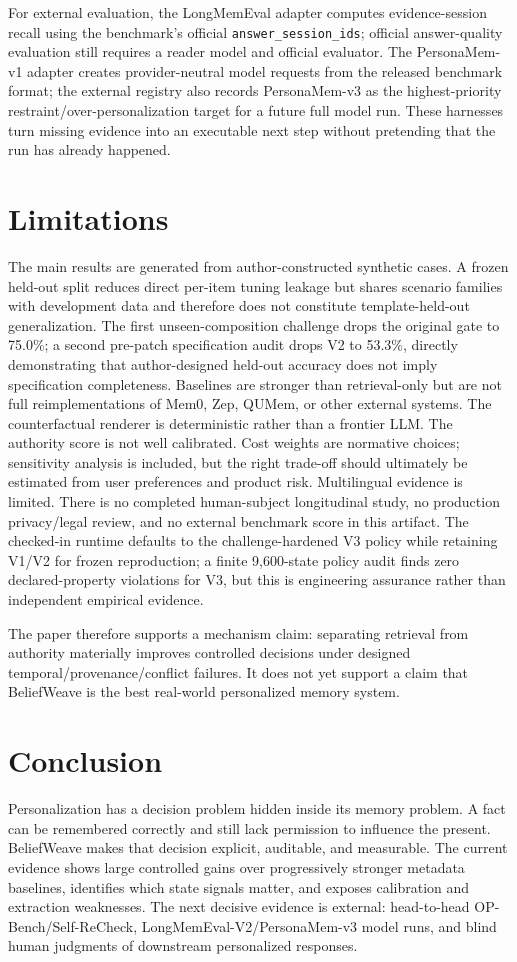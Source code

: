 \documentclass[10pt]{article}
\begin{document}
For external evaluation, the LongMemEval adapter computes evidence-session recall using the benchmark's official \texttt{answer\_session\_ids}; official answer-quality evaluation still requires a reader model and official evaluator. The PersonaMem-v1 adapter creates provider-neutral model requests from the released benchmark format; the external registry also records PersonaMem-v3 as the highest-priority restraint/over-personalization target for a future full model run. These harnesses turn missing evidence into an executable next step without pretending that the run has already happened.

\section{Limitations}
The main results are generated from author-constructed synthetic cases. A frozen held-out split reduces direct per-item tuning leakage but shares scenario families with development data and therefore does not constitute template-held-out generalization. The first unseen-composition challenge drops the original gate to 75.0\%; a second pre-patch specification audit drops V2 to 53.3\%, directly demonstrating that author-designed held-out accuracy does not imply specification completeness. Baselines are stronger than retrieval-only but are not full reimplementations of Mem0, Zep, QUMem, or other external systems. The counterfactual renderer is deterministic rather than a frontier LLM. The authority score is not well calibrated. Cost weights are normative choices; sensitivity analysis is included, but the right trade-off should ultimately be estimated from user preferences and product risk. Multilingual evidence is limited. There is no completed human-subject longitudinal study, no production privacy/legal review, and no external benchmark score in this artifact. The checked-in runtime defaults to the challenge-hardened V3 policy while retaining V1/V2 for frozen reproduction; a finite 9,600-state policy audit finds zero declared-property violations for V3, but this is engineering assurance rather than independent empirical evidence.

The paper therefore supports a mechanism claim: separating retrieval from authority materially improves controlled decisions under designed temporal/provenance/conflict failures. It does not yet support a claim that BeliefWeave is the best real-world personalized memory system.

\section{Conclusion}
Personalization has a decision problem hidden inside its memory problem. A fact can be remembered correctly and still lack permission to influence the present. BeliefWeave makes that decision explicit, auditable, and measurable. The current evidence shows large controlled gains over progressively stronger metadata baselines, identifies which state signals matter, and exposes calibration and extraction weaknesses. The next decisive evidence is external: head-to-head OP-Bench/Self-ReCheck, LongMemEval-V2/PersonaMem-v3 model runs, and blind human judgments of downstream personalized responses.
\end{document}
